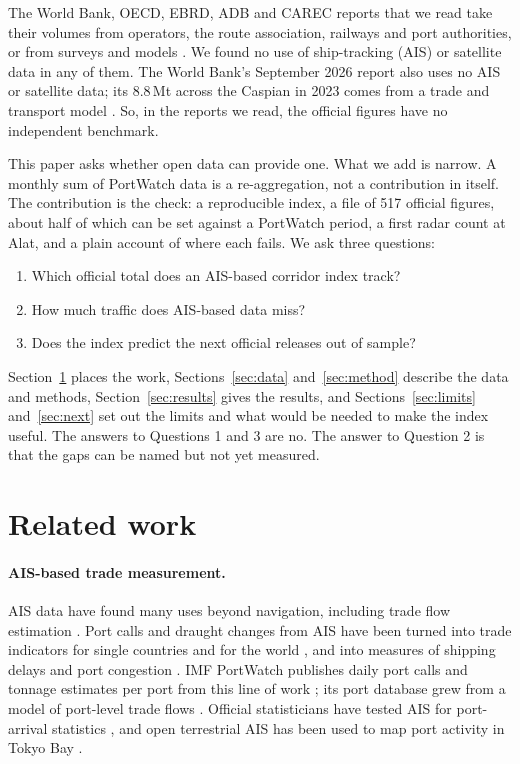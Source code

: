 \documentclass[11pt,a4paper]{article}
\newcommand{\Mt}{\,Mt}
\begin{document}
The World Bank, OECD, EBRD, ADB and CAREC reports that we read take their volumes from operators, the route association, railways and port authorities, or from surveys and models \cite{worldbank2023middle,oecd2023realising,oecd2025enhancing,ebrd2023sustainable,adb2024tradeflows,carec2022cpmm,carec2024cpmm}. We found no use of ship-tracking (AIS) or satellite data in any of them. The World Bank's September 2026 report also uses no AIS or satellite data; its 8.8\Mt{} across the Caspian in 2023 comes from a trade and transport model \cite{worldbank2026integration}. So, in the reports we read, the official figures have no independent benchmark.

This paper asks whether open data can provide one. What we add is narrow. A monthly sum of PortWatch data is a re-aggregation, not a contribution in itself. The contribution is the check: a reproducible index, a file of 517 official figures, about half of which can be set against a PortWatch period, a first radar count at Alat, and a plain account of where each fails. We ask three questions:
\begin{enumerate}
\item Which official total does an AIS-based corridor index track?
\item How much traffic does AIS-based data miss?
\item Does the index predict the next official releases out of sample?
\end{enumerate}
Section~\ref{sec:related} places the work, Sections~\ref{sec:data} and~\ref{sec:method} describe the data and methods, Section~\ref{sec:results} gives the results, and Sections~\ref{sec:limits} and~\ref{sec:next} set out the limits and what would be needed to make the index useful. The answers to Questions 1 and 3 are no. The answer to Question 2 is that the gaps can be named but not yet measured.

\section{Related work}
\label{sec:related}

\paragraph{AIS-based trade measurement.} AIS data have found many uses beyond navigation, including trade flow estimation \cite{yang2019big}. Port calls and draught changes from AIS have been turned into trade indicators for single countries and for the world \cite{arslanalp2019big,cerdeiro2020world,arslanalp2021tracking,verschuur2021global,lechthaler2022kiel,stamer2024thinking}, and into measures of shipping delays and port congestion \cite{komaromi2022supply}. IMF PortWatch publishes daily port calls and tonnage estimates per port from this line of work \cite{portwatch2026dailyports,arslanalp2025nowcasting,arslanalp2026nowcasting}; its port database grew from a model of port-level trade flows \cite{verschuur2022ports}. Official statisticians have tested AIS for port-arrival statistics \cite{vanderwielen2024optimising}, and open terrestrial AIS has been used to map port activity in Tokyo Bay \cite{hutten2026high}.
\end{document}
